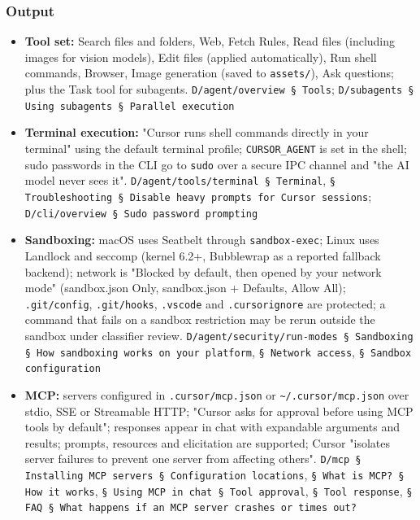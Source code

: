 \subsubsection*{Output}
\begin{itemize}
\item \textbf{Tool set:} Search files and folders, Web, Fetch Rules, Read files (including images for vision models), Edit files (applied automatically), Run shell commands, Browser, Image generation (saved to \texttt{assets/\allowbreak{}}), Ask questions; plus the Task tool for subagents. \texttt{D/\allowbreak{}agent/\allowbreak{}overview § Tools}; \texttt{D/\allowbreak{}subagents § Using subagents § Parallel execution}
\item \textbf{Terminal execution:} "Cursor runs shell commands directly in your terminal" using the default terminal profile; \texttt{CURSOR\_\allowbreak{}AGENT} is set in the shell; sudo passwords in the CLI go to \texttt{sudo} over a secure IPC channel and "the AI model never sees it". \texttt{D/\allowbreak{}agent/\allowbreak{}tools/\allowbreak{}terminal § Terminal}, \texttt{§ Troubleshooting § Disable heavy prompts for Cursor sessions}; \texttt{D/\allowbreak{}cli/\allowbreak{}overview § Sudo password prompting}
\item \textbf{Sandboxing:} macOS uses Seatbelt through \texttt{sandbox-\allowbreak{}exec}; Linux uses Landlock and seccomp (kernel 6.2+, Bubblewrap as a reported fallback backend); network is "Blocked by default, then opened by your network mode" (sandbox.json Only, sandbox.json + Defaults, Allow All); \texttt{.\allowbreak{}git/\allowbreak{}config}, \texttt{.\allowbreak{}git/\allowbreak{}hooks}, \texttt{.\allowbreak{}vscode} and \texttt{.\allowbreak{}cursorignore} are protected; a command that fails on a sandbox restriction may be rerun outside the sandbox under classifier review. \texttt{D/\allowbreak{}agent/\allowbreak{}security/\allowbreak{}run-\allowbreak{}modes § Sandboxing § How sandboxing works on your platform}, \texttt{§ Network access}, \texttt{§ Sandbox configuration}
\item \textbf{MCP:} servers configured in \texttt{.\allowbreak{}cursor/\allowbreak{}mcp.\allowbreak{}json} or \texttt{\textasciitilde{}/\allowbreak{}.\allowbreak{}cursor/\allowbreak{}mcp.\allowbreak{}json} over stdio, SSE or Streamable HTTP; "Cursor asks for approval before using MCP tools by default"; responses appear in chat with expandable arguments and results; prompts, resources and elicitation are supported; Cursor "isolates server failures to prevent one server from affecting others". \texttt{D/\allowbreak{}mcp § Installing MCP servers § Configuration locations}, \texttt{§ What is MCP? § How it works}, \texttt{§ Using MCP in chat § Tool approval}, \texttt{§ Tool response}, \texttt{§ FAQ § What happens if an MCP server crashes or times out?}

\end{itemize}
